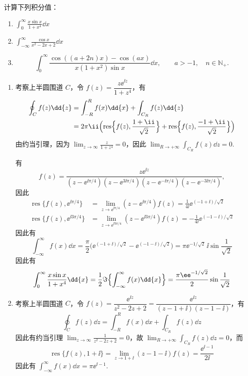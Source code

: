 
\begin{question}
计算下列积分值：
\begin{enumerate}
  \item \(\displaystyle\int_0^\infty \frac{x\sin x}{1+x^4}\dd{x}\)

  \item \(\displaystyle\int_{-\infty}^\infty \frac{\cos x}{x^2-2x+2}\dd{x}\)

  \item
  \[
  \int_0^\infty
  \frac{\cos((a+2n)x)-\cos(ax)}{x(1+x^2)\sin x}\dd{x},
  \qquad a>-1,\quad n\in\mathbb{N}_+.
  \]
\end{enumerate}

\begin{solution}
\begin{enumerate}
  \item 考察上半圆围道 \(C\)，令 \(f(z)=\dfrac{z\ee^{\ii z}}{1+z^4}\)，有
\[

\begin{aligned}
\oint_C f(z)\dd{z}
&=\int_{-R}^{R}f(x)\dd{x}+\int_{C_R}f(z)\dd{z}\\
&=2\pi\ii\Bigl(\operatorname{res}\Bigl\{f(z),\frac{1+\ii}{\sqrt2}\Bigr\}
   +\operatorname{res}\Bigl\{f(z),\frac{-1+\ii}{\sqrt2}\Bigr\}\Bigr)
\end{aligned}
\]
由约当引理，因为 \(\displaystyle\lim_{z\to\infty}\frac{z}{1+z^4}=0\)，因此 \(\displaystyle\lim_{R\to+\infty}\int_{C_R}f(z)\dd{z}=0\).

有
\[
f(z)=\frac{z\ee^{\ii z}}
{(z-\ee^{\ii\pi/4})(z-\ee^{3\ii\pi/4})
 (z-\ee^{-\ii\pi/4})(z-\ee^{-3\ii\pi/4})},
\]
因此
\[
\begin{aligned}
\operatorname{res}\{f(z),\ee^{\ii\pi/4}\}&=\lim_{z\to\ee^{\ii\pi/4}}(z-\ee^{\ii\pi/4})f(z)=\frac1{4\ii}\ee^{(-1+\ii)/\sqrt2}\\
\operatorname{res}\{f(z),\ee^{\ii3\pi/4}\}&=\lim_{z\to\ee^{\ii3\pi/4}}(z-\ee^{\ii3\pi/4})f(z)=-\frac1{4\ii}\ee^{(-1-\ii)/\sqrt2}
\end{aligned}
\]
因此有
\[
\int_{-\infty}^{\infty}f(x)\dd{x}=\frac{\pi}{2}\bigl(\ee^{(-1+\ii)/\sqrt2}-\ee^{(-1-\ii)/\sqrt2}\bigr)=\pi\ee^{-1/\sqrt2}\,\ii\sin\frac1{\sqrt2}
\]
因此有
\[
\int_0^{\infty}\frac{x\sin x}{1+x^4}\dd{x}=\frac12\Im\Bigl\{\int_{-\infty}^{\infty}f(x)\dd{x}\Bigr\}=\frac{\pi\ee^{-1/\sqrt2}}{2}\sin\frac1{\sqrt2}
\]

  \item 考察上半圆围道 \(C\)，令 \(f(z)=\dfrac{\ee^{\ii z}}{z^2-2z+2}=\dfrac{\ee^{\ii z}}{(z-1+\ii)(z-1-\ii)}\)，有
\[
\oint_C f(z)\dd{z}=\int_{-R}^{R}f(x)\dd{x}+\int_{C_R}f(z)\dd{z}
\]
因此有约当引理 \(\displaystyle\lim_{z\to\infty}\frac1{z^2-2z+2}=0\)，故 \(\displaystyle\lim_{R\to+\infty}\int_{C_R}f(z)\dd{z}=0\)，而
\[
\operatorname{res}\{f(z),1+\ii\}=\lim_{z\to1+\ii}(z-1-\ii)f(z)=\frac{\ee^{\ii-1}}{2\ii}
\]
因此有 \(\displaystyle\int_{-\infty}^{\infty}f(x)\dd{x}=\pi\ee^{\ii-1}\).


\end{enumerate}
\end{solution}
\end{question}
